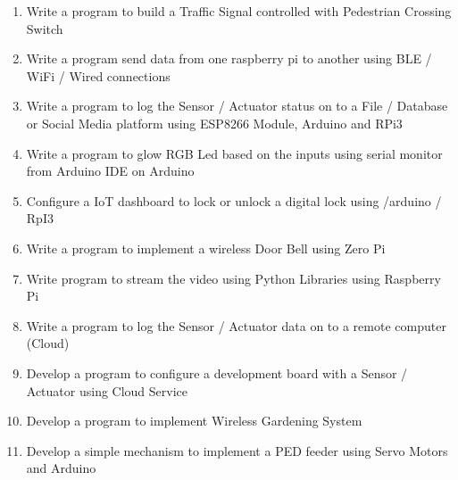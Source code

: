 \documentclass[12pt,a4paper]{article}
\begin{document}
\begin{enumerate}
    \item Write a program to build a Traffic Signal controlled with Pedestrian Crossing Switch
   \item  Write a program send data from one raspberry pi to another using BLE / WiFi / Wired connections
    \item Write a program to log the Sensor / Actuator status on to a File / Database or Social Media platform using ESP8266 Module, Arduino and RPi3
   \item  Write a program to glow RGB Led based on the inputs using serial monitor from Arduino IDE on Arduino
   \item  Configure a IoT dashboard to lock or unlock a digital lock using /arduino / RpI3 
   \item  Write a program to implement a wireless Door Bell using Zero Pi
   \item  Write  program to stream the video using Python Libraries using Raspberry Pi
    \item Write a program to log the  Sensor / Actuator data on to a remote computer (Cloud)
  \item  Develop a program to configure a development board with a Sensor / Actuator using Cloud Service
  \item  Develop a program to implement Wireless Gardening System
   \item  Develop a simple mechanism to implement a PED feeder using Servo Motors and Arduino
    
\end{enumerate}
\end{document}
